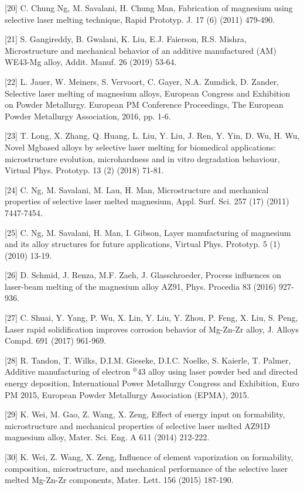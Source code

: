 \documentclass[10pt]{article}
\begin{document}
[20] C. Chung Ng, M. Savalani, H. Chung Man, Fabrication of magnesium using selective laser melting technique, Rapid Prototyp. J. 17 (6) (2011) 479-490.

[21] S. Gangireddy, B. Gwalani, K. Liu, E.J. Faierson, R.S. Mishra, Microstructure and mechanical behavior of an additive manufactured (AM) WE43-Mg alloy, Addit. Manuf. 26 (2019) 53-64.

[22] L. Jauer, W. Meiners, S. Vervoort, C. Gayer, N.A. Zumdick, D. Zander, Selective laser melting of magnesium alloys, European Congress and Exhibition on Powder Metallurgy. European PM Conference Proceedings, The European Powder Metallurgy Association, 2016, pp. 1-6.

[23] T. Long, X. Zhang, Q. Huang, L. Liu, Y. Liu, J. Ren, Y. Yin, D. Wu, H. Wu, Novel Mgbased alloys by selective laser melting for biomedical applications: microstructure evolution, microhardness and in vitro degradation behaviour, Virtual Phys. Prototyp. 13 (2) (2018) 71-81.

[24] C. Ng, M. Savalani, M. Lau, H. Man, Microstructure and mechanical properties of selective laser melted magnesium, Appl. Surf. Sci. 257 (17) (2011) 7447-7454.

[25] C. Ng, M. Savalani, H. Man, I. Gibson, Layer manufacturing of magnesium and its alloy structures for future applications, Virtual Phys. Prototyp. 5 (1) (2010) 13-19.

[26] D. Schmid, J. Renza, M.F. Zaeh, J. Glasschroeder, Process influences on laser-beam melting of the magnesium alloy AZ91, Phys. Procedia 83 (2016) 927-936.

[27] C. Shuai, Y. Yang, P. Wu, X. Lin, Y. Liu, Y. Zhou, P. Feng, X. Liu, S. Peng, Laser rapid solidification improves corrosion behavior of Mg-Zn-Zr alloy, J. Alloys Compd. 691 (2017) 961-969.

[28] R. Tandon, T. Wilks, D.I.M. Gieseke, D.I.C. Noelke, S. Kaierle, T. Palmer, Additive manufacturing of electron ${ }^{\circledR} 43$ alloy using laser powder bed and directed energy deposition, International Power Metallurgy Congress and Exhibition, Euro PM 2015, European Powder Metallurgy Association (EPMA), 2015.

[29] K. Wei, M. Gao, Z. Wang, X. Zeng, Effect of energy input on formability, microstructure and mechanical properties of selective laser melted AZ91D magnesium alloy, Mater. Sci. Eng. A 611 (2014) 212-222.

[30] K. Wei, Z. Wang, X. Zeng, Influence of element vaporization on formability, composition, microstructure, and mechanical performance of the selective laser melted Mg-Zn-Zr components, Mater. Lett. 156 (2015) 187-190.
\end{document}
